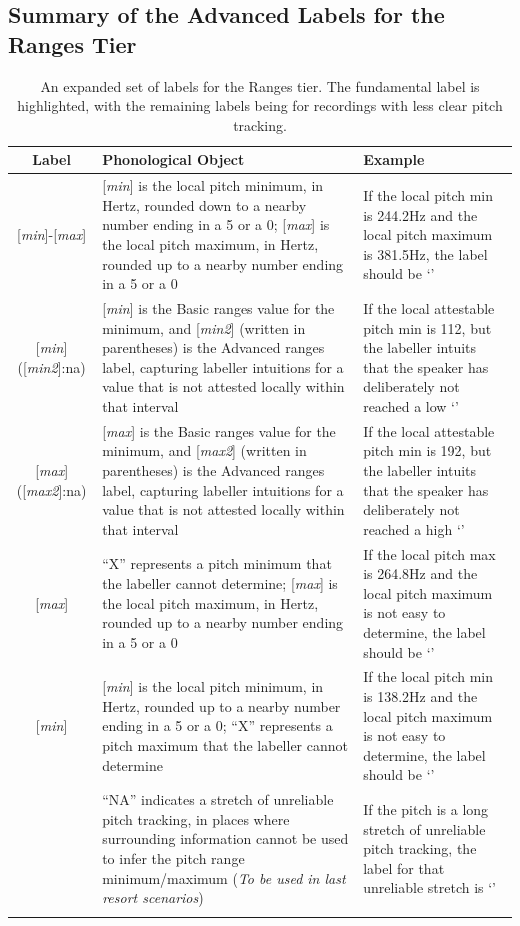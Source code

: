 \documentclass[11pt, twoside]{memoir}
\def\textlabel#1{{\relsize{-.5}\fontspec[Mapping=tex-text]{Roboto Mono}{#1}}}
\begin{document}
\subsection{Summary of the Advanced Labels for the Ranges Tier}\label{sec:summary-advanced-ranges-labels}
\begin{longtable}{cp{.46\linewidth}p{.32\linewidth}} \toprule \textbf{Label} & \textbf{Phonological Object} & \textbf{Example}\tabularnewline
\midrule \endhead
\rowcolor{green}
{[\textit{min}]-[\textit{max}]} &
	{[\textit{min}] is the local pitch minimum, in Hertz, rounded down to a nearby number ending in a 5 or a 0}; {[\textit{max}] is the local pitch maximum, in Hertz, rounded up to a nearby number ending in a 5 or a 0} &
	If the local pitch min is 244.2Hz and the local pitch maximum is 381.5Hz, the label should be ‘\textlabel{240-385}’
	\tabularnewline
{[\textit{min}]([\textit{min2}]:na)} &
	[\textit{min}] is the Basic ranges value for the minimum, and [\textit{min2}] (written in parentheses) is the Advanced ranges label, capturing labeller intuitions for a value that is not attested locally within that interval &
	If the local attestable pitch min is 112, but the labeller intuits that the speaker has deliberately not reached a low ‘\textlabel{110(90:na)-385}’
	\tabularnewline
{[\textit{max}]([\textit{max2}]:na)} &
	[\textit{max}] is the Basic ranges value for the minimum, and [\textit{max2}] (written in parentheses) is the Advanced ranges label, capturing labeller intuitions for a value that is not attested locally within that interval &
	If the local attestable pitch min is 192, but the labeller intuits that the speaker has deliberately not reached a high ‘\textlabel{90-192(300:na)}’
	\tabularnewline
{\textlabel{X-}[\textit{max}]} &
	{“X” represents a pitch minimum that the labeller cannot determine}; {[\textit{max}] is the local pitch maximum, in Hertz, rounded up to a nearby number ending in a 5 or a 0}	 &
	If the local pitch max is 264.8Hz and the local pitch maximum is not easy to determine, the label should be ‘\textlabel{X-270}’
	\tabularnewline
{[\textit{min}]\textlabel{-X}} &
	{[\textit{min}] is the local pitch minimum, in Hertz, rounded up to a nearby number ending in a 5 or a 0}; {“X” represents a pitch maximum that the labeller cannot determine}	 &
	If the local pitch min is 138.2Hz and the local pitch maximum is not easy to determine, the label should be ‘\textlabel{135-X}’
	\tabularnewline
\textlabel{NA} &
	“NA” indicates a stretch of unreliable pitch tracking, in places where surrounding information cannot be used to infer the pitch range minimum\slash maximum (\textit{To be used in last resort scenarios}) &
	If the pitch is a long stretch of unreliable pitch tracking, the label for that unreliable stretch is ‘\textlabel{NA}’
	\tabularnewline
\bottomrule 
\caption[An expanded set of labels for the Ranges tier.]{An expanded set of labels for the Ranges tier. The fundamental label is highlighted, with the remaining labels being for recordings with less clear pitch tracking.}
\end{longtable}
\end{document}
